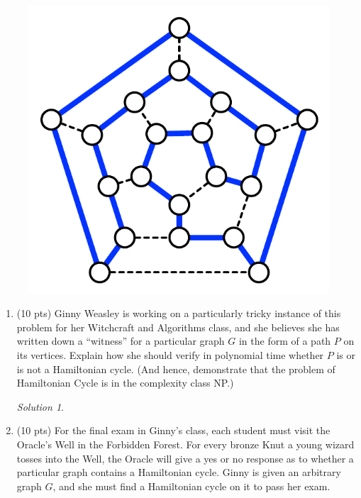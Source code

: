 \documentclass[12pt]{article}
\theoremstyle{remark}
\newtheorem*{solution}{Solution}
\begin{document}
\begin{enumerate}
\begin{figure}[h!]
\begin{center}
\includegraphics[scale=0.7]{hamiltonian.pdf} 
\end{center}
\vspace{-4mm}
\end{figure}


	\begin{enumerate}
	\item (10 pts) Ginny Weasley is working on a particularly tricky instance of this problem for her Witchcraft and Algorithms class, and she believes she has written down a ``witness'' for a particular graph $G$ in the form of a path $P$ on its vertices. Explain how she should verify in polynomial time whether $P$ is or is not a Hamiltonian cycle. (And hence, demonstrate that the problem of Hamiltonian Cycle is in the complexity class NP.)
	\begin{solution}
    
    \end{solution}
    \pagebreak
    
	
	
	\item (10 pts) For the final exam in Ginny's class, each student must visit the Oracle's Well in the Forbidden Forest. For every bronze Knut a young wizard tosses into the Well, the Oracle will give a yes or no response as to whether a particular graph contains a Hamiltonian cycle. Ginny is given an arbitrary graph $G$, and she must find a Hamiltonian cycle on it to pass her exam.
	

\end{enumerate}
\end{enumerate}
\end{document}
